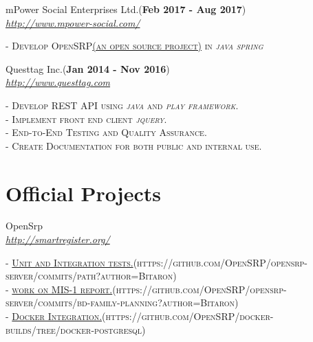 \documentclass[10pt]{article} %
\begin{document}
{\begin{minipage}[t]{0.5\textwidth}
{{\raggedright\large mPower Social Enterprises Ltd.(\textbf{Feb 2017 - Aug 2017})\\
\textit{\href {http://www.mpower-social.com/}{http://www.mpower-social.com/}}\\
}}
	\textsc{- Develop OpenSRP\href {http://smartregister.org/}{(an open source project)} in \textit{java} \textit{spring}}\\


{{\raggedright\large Questtag Inc.(\textbf{Jan 2014 - Nov 2016})  \\
\textit{\href {http://www.questtag.com}{http://www.questtag.com}}\\
}}
	 \textsc{- Develop REST API using \textit{java} and \textit{play framework}.}\\
	 \textsc{- Implement front end client \textit{jquery}.}\\
	 \textsc{- End-to-End Testing and Quality Assurance.}\\
	 \textsc{- Create Documentation for both public and internal use.}\\
	




\section{Official Projects} 



{\raggedright\large OpenSrp\\
\textit{\href{http://smartregister.org/}{http://smartregister.org/}}\\[2pt]
}

\textsc{- \href{https://github.com/OpenSRP/opensrp-server/commits/path?author=Bitaron}{Unit and Integration tests.}(https://github.com/OpenSRP/opensrp-server/commits/path?author=Bitaron)}\\
\textsc{- \href{https://github.com/OpenSRP/opensrp-server/commits/bd-family-planning?author=Bitaron}{work on MIS-1 report.}(https://github.com/OpenSRP/opensrp-server/commits/bd-family-planning?author=Bitaron)}\\
\textsc{- \href{https://github.com/OpenSRP/docker-builds/tree/docker-postgresql}{Docker Integration.}(https://github.com/OpenSRP/docker-builds/tree/docker-postgresql)}\\




\end{minipage}}
\end{document}
